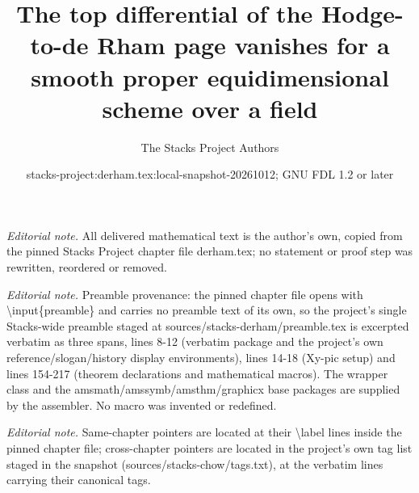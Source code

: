 \documentclass[10pt,a4paper]{amsart}
\title{The top differential of the Hodge-to-de Rham page vanishes for a smooth proper equidimensional scheme over a field}
\author{The Stacks Project Authors}
\date{stacks-project:derham.tex:local-snapshot-20261012; GNU FDL 1.2 or later}
\theoremstyle{plain}
\theoremstyle{definition}
\theoremstyle{remark}
\numberwithin{equation}{subsection}
\begin{document}
\maketitle
\noindent\textit{Editorial note.} All delivered mathematical text is the author's own, copied from the pinned Stacks Project chapter file derham.tex; no statement or proof step was rewritten, reordered or removed.\par\medskip
\noindent\textit{Editorial note.} Preamble provenance: the pinned chapter file opens with \textbackslash{}input\{preamble\} and carries no preamble text of its own, so the project's single Stacks-wide preamble staged at sources/stacks-derham/preamble.tex is excerpted verbatim as three spans, lines 8-12 (verbatim package and the project's own reference/slogan/history display environments), lines 14-18 (Xy-pic setup) and lines 154-217 (theorem declarations and mathematical macros). The wrapper class and the amsmath/amssymb/amsthm/graphicx base packages are supplied by the assembler. No macro was invented or redefined.\par\medskip
\noindent\textit{Editorial note.} Same-chapter pointers are located at their \textbackslash{}label lines inside the pinned chapter file; cross-chapter pointers are located in the project's own tag list staged in the snapshot (sources/stacks-chow/tags.txt), at the verbatim lines carrying their canonical tags.\par\medskip
\end{document}
